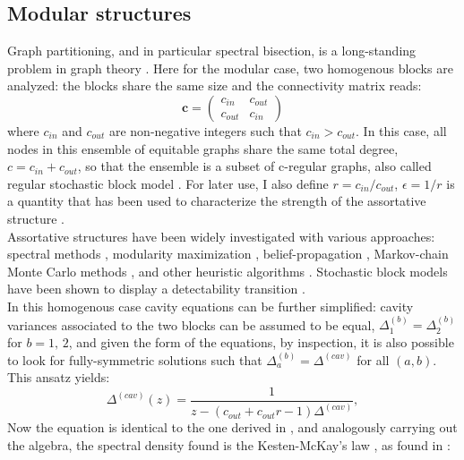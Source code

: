 \documentclass[%
 reprint,
 amsmath,amssymb,
 aps,
 pre,
 showpacs
]{revtex4-1}
\begin{document}
\subsection{\label{sec:res_mod}Modular structures}

Graph partitioning, and in particular spectral bisection, is a long-standing problem in graph theory \cite{fortunato2010community,boppana1987eigenvalues,pothen1990partitioning,bollobas1999exact}.
Here for the modular case, two homogenous blocks are analyzed: the blocks share the same size and the connectivity matrix reads:
\begin{equation}
\mathbf{c}=\left(\begin{array}{ccc}
c_{in} & c_{out}\\
c_{out} & c_{in}
\end{array}\right)\label{eq:affmat}
\end{equation}
where $c_{in}$ and $c_{out}$ are non-negative integers such that $c_{in}>c_{out}$. In this case, all nodes in this ensemble of equitable graphs share the same total degree, $c = c_{in}+c_{out}$, so that the ensemble is a subset of c-regular graphs, also called regular stochastic block model \cite{brito2016recovery}.
For later use, I also define $r=c_{in}/c_{out}$, $\epsilon = 1/r$ is a quantity that has been used to characterize the strength of the assortative structure \cite{decelle2011asymptotic}.\\
Assortative structures have been widely investigated with various approaches: spectral methods \cite{krzakala2013spectral}, modularity maximization \cite{newman2016community}, belief-propagation \cite{decelle2011asymptotic}, Markov-chain Monte Carlo methods \cite{peixoto2013parsimonious}, and other heuristic algorithms \cite{blondel2008fast}. Stochastic block models have been shown to display a detectability transition \cite{decelle2011asymptotic,mossel2013proof}. \\
In this homogenous case cavity equations can be further simplified: cavity variances associated to the two blocks can be assumed to be equal, $\Delta_1^{(b)}=\Delta_2^{(b)}$ for $b=1,\,2$, and given the form of the equations, by inspection, it is also possible to look for fully-symmetric solutions such that $\Delta_{a}^{(b)} = \Delta^{(cav)}$ for all $(a,b)$. This ansatz yields:
\begin{equation}\label{eq:symmAnsatz}
\Delta^{(cav)}(z)=\frac{1}{z-(c_{out}+c_{out}r-1)\Delta^{(cav)}},
\end{equation}
Now the equation is identical to the one derived in \cite{rogers2008cavity}, and analogously carrying out the algebra, the spectral density found is the Kesten-McKay's law \cite{McKay1981expected}, as found in \cite{newman2014equitable}:
\end{document}
